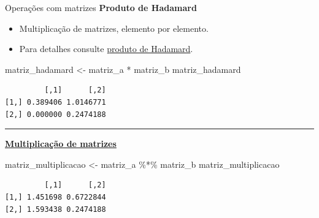 \documentclass[
  10pt,
  ignorenonframetext,
]{beamer}
\newenvironment{Shaded}{\begin{snugshade}}{\end{snugshade}}
\newcommand{\NormalTok}[1]{\textcolor[rgb]{0.00,0.23,0.31}{#1}}
\newcommand{\OtherTok}[1]{\textcolor[rgb]{0.00,0.23,0.31}{#1}}
\newcommand{\SpecialCharTok}[1]{\textcolor[rgb]{0.37,0.37,0.37}{#1}}
\providecommand{\tightlist}{%
  \setlength{\itemsep}{0pt}\setlength{\parskip}{0pt}}\usepackage{longtable,booktabs,array}
\newcommand*{\regrafina}{\rule{\textwidth}{0.5pt}}
\begin{document}
\begin{frame}[fragile]{Operações com matrizes}
\protect\hypertarget{operauxe7uxf5es-com-matrizes-1}{}
\textbf{Produto de Hadamard}

\begin{itemize}
\tightlist
\item
  Multiplicação de matrizes, elemento por elemento.
\item
  Para detalhes consulte
  \href{https://en.wikipedia.org/wiki/Hadamard_product_(matrices)}{produto
  de Hadamard}.
\end{itemize}

\begin{Shaded}
\begin{Highlighting}[]
\NormalTok{matriz\_hadamard }\OtherTok{\textless{}{-}}\NormalTok{ matriz\_a }\SpecialCharTok{*}\NormalTok{ matriz\_b}
\NormalTok{matriz\_hadamard}
\end{Highlighting}
\end{Shaded}

\begin{verbatim}
         [,1]      [,2]
[1,] 0.389406 1.0146771
[2,] 0.000000 0.2474188
\end{verbatim}

\regrafina

\href{https://pt.wikipedia.org/wiki/Matriz_inversa}{\textbf{Multiplicação
de matrizes}}

\begin{Shaded}
\begin{Highlighting}[]
\NormalTok{matriz\_multiplicacao }\OtherTok{\textless{}{-}}\NormalTok{ matriz\_a }\SpecialCharTok{\%*\%}\NormalTok{ matriz\_b}
\NormalTok{matriz\_multiplicacao}
\end{Highlighting}
\end{Shaded}

\begin{verbatim}
         [,1]      [,2]
[1,] 1.451698 0.6722844
[2,] 1.593438 0.2474188
\end{verbatim}
\end{frame}
\end{document}
